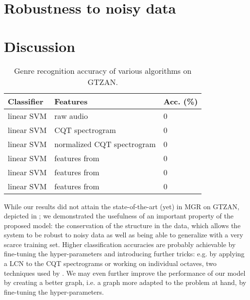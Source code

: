 \section{Robustness to noisy data}

\section{Discussion}

\begin{table}
	\begin{center}
		\begin{tabular}{|l|l|l|}
			\hline
			Classifier & Features & Acc. (\%) \\
			\hline
			linear SVM & raw audio & 0 \\
			linear SVM & CQT spectrogram & 0 \\
			linear SVM & normalized CQT spectrogram & 0 \\
			linear SVM & features from \eqnref{basispursuit} & 0 \\
			linear SVM & features from \eqnref{minz} & 0 \\
			linear SVM & features from \eqnref{extraction} & 0 \\
			\hline
		\end{tabular}
	\end{center}
	\caption{Genre recognition accuracy of various algorithms on GTZAN.}
	\label{tab:accuracy_comparison}
\end{table}

While our results did not attain the state-of-the-art (yet) in \gls{MGR} on GTZAN, depicted in ;
we demonstrated the usefulness of an important property of the proposed model: the conservation of the structure in the data, which allows the system to be robust to noisy data as well as being able to generalize with a very scarce training set.
Higher classification accuracies are probably achievable by fine-tuning the hyper-parameters and introducing further tricks: e.g. by applying a \gls{LCN} to the \gls{CQT} spectrograms or working on individual octaves, two techniques used by \cite{lecun2011PSDaudio}. We may even further improve the performance of our model by creating a better graph, i.e. a graph more adapted to the problem at hand, by fine-tuning the hyper-parameters.